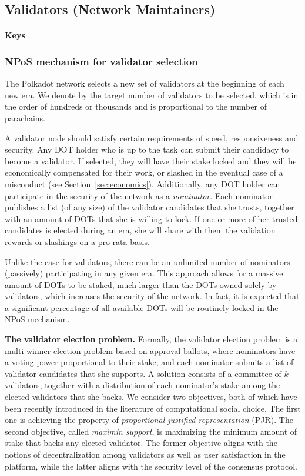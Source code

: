 \subsection{Validators (Network Maintainers)}
 \paragraph{Keys}

 \subsubsection{NPoS mechanism for validator selection}

 The Polkadot network selects a new set of validators at the beginning of each new era. We denote by \nval the target number of validators to be selected, which is in the order of hundreds or thousands and is proportional to the number of parachains. 

A validator node should satisfy certain requirements of speed, responsiveness and security. Any DOT holder who is up to the task can submit their candidacy to become a validator. If selected, they will have their stake locked and they will be economically compensated for their work, or slashed in the eventual case of a misconduct (see Section~\ref{sec:economics}). Additionally, any DOT holder can participate in the security of the network as a \emph{nominator}. Each nominator publishes a list (of any size) of the validator candidates that she trusts, together with an amount of DOTs that she is willing to lock. If one or more of her trusted candidates is elected during an era, she will share with them the validation rewards or slashings on a pro-rata basis. 

Unlike the case for validators, there can be an unlimited number of nominators (passively) participating in any given era. This approach allows for a massive amount of DOTs to be staked, much larger than the DOTs owned solely by validators, which increases the security of the network. In fact, it is expected that a significant percentage of all available DOTs will be routinely locked in the NPoS mechanism.

\textbf{The validator election problem.} Formally, the validator election problem is a multi-winner election problem based on approval ballots, where nominators have a voting power proportional to their stake, and each nominator submits a list of validator candidates that she supports. A solution consists of a committee of $k$ validators, together with a distribution of each nominator's stake among the elected validators that she backs. We consider two objectives, both of which have been recently introduced in the literature of computational social choice. The first one is achieving the property of \emph{proportional justified representation} (PJR). The second objective, called \emph{maximin support}, is maximizing the minimum amount of stake that backs any elected validator. The former objective aligns with the notions of decentralization among validators as well as user satisfaction in the platform, while the latter aligns with the security level of the consensus protocol. 

